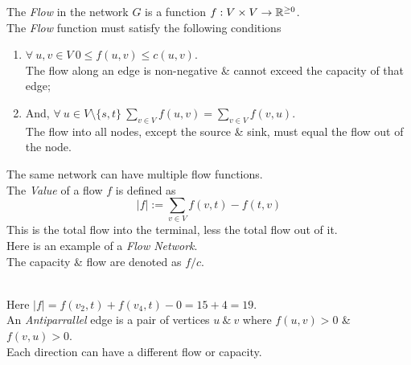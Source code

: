 \documentclass[11pt,a4paper]{article}
\begin{document}
\newpage
{}
The \textit{Flow} in the network $G$ is a function $f:V\times V\to\mathbb{R}^{\geq0}$.\\
The \textit{Flow} function must satisfy the following conditions
\begin{enumerate}
	\item $\forall\ u,v\in V\ 0\leq f(u,v)\leq c(u,v)$.\\
	The flow along an edge is non-negative \& cannot exceed the capacity of that edge;
	\item And, $\forall\ u\in V\setminus\{s,t\}\ \sum_{v\in V}f(u,v)=\sum_{v\in V}f(v,u)$.\\
	The flow into all nodes, except the source \& sink, must equal the flow out of the node.
\end{enumerate}
\nb The same network can have multiple flow functions.\\

The \textit{Value} of a flow $f$ is defined as
$$|f|:=\sum_{v\in V}f(v,t)-f(t,v)$$
\nb This is the total flow into the terminal, less the total flow out of it.\\

Here is an example of a \textit{Flow Network}.\\
The capacity \& flow are denoted as $f/c$.\\
\\
\nb Here $|f|=f(v_2,t)+f(v_4,t)-0=15+4=19$.\\

An \textit{Antiparrallel} edge is a pair of vertices $u\ \&\ v$ where $f(u,v)>0$ \& $f(v,u)>0$.\\
\nb Each direction can have a different flow or capacity.\\
\end{document}
